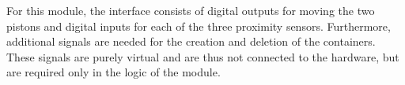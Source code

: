     For this module, the interface consists of digital outputs for moving the two pistons and digital inputs for each of the three proximity sensors. Furthermore, additional signals are needed for the creation and deletion of the containers. These signals are purely virtual and are thus not connected to the hardware, but are required only in the logic of the module.\\
    

